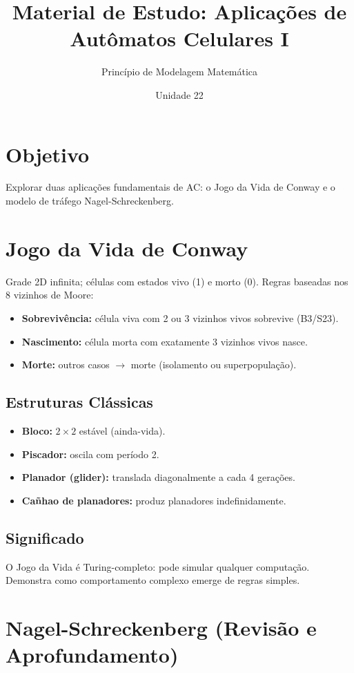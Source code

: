 \documentclass[12pt,a4paper]{article}
\title{Material de Estudo: Aplica\c{c}\~oes de Aut\^omatos Celulares I}
\author{Princ\'ipio de Modelagem Matem\'atica}
\date{Unidade 22}
\begin{document}
\maketitle

\section*{Objetivo}
Explorar duas aplica\c{c}\~oes fundamentais de AC: o Jogo da Vida de Conway e o modelo de tr\'afego Nagel-Schreckenberg.

\section*{Jogo da Vida de Conway}

Grade 2D infinita; c\'elulas com estados vivo (1) e morto (0). Regras baseadas nos 8 vizinhos de Moore:
\begin{itemize}
  \item \textbf{Sobreviv\^encia:} c\'elula viva com 2 ou 3 vizinhos vivos sobrevive (B3/S23).
  \item \textbf{Nascimento:} c\'elula morta com exatamente 3 vizinhos vivos nasce.
  \item \textbf{Morte:} outros casos $\to$ morte (isolamento ou superpopula\c{c}\~ao).
\end{itemize}

\subsection*{Estruturas Cl\'assicas}
\begin{itemize}
  \item \textbf{Bloco:} $2\times2$ est\'avel (ainda-vida).
  \item \textbf{Piscador:} oscila com per\'iodo 2.
  \item \textbf{Planador (glider):} translada diagonalmente a cada 4 gera\c{c}\~oes.
  \item \textbf{Ca\~nhao de planadores:} produz planadores indefinidamente.
\end{itemize}

\subsection*{Significado}
O Jogo da Vida \'e Turing-completo: pode simular qualquer computa\c{c}\~ao. Demonstra como comportamento complexo emerge de regras simples.

\section*{Nagel-Schreckenberg (Revis\~ao e Aprofundamento)}
\end{document}
